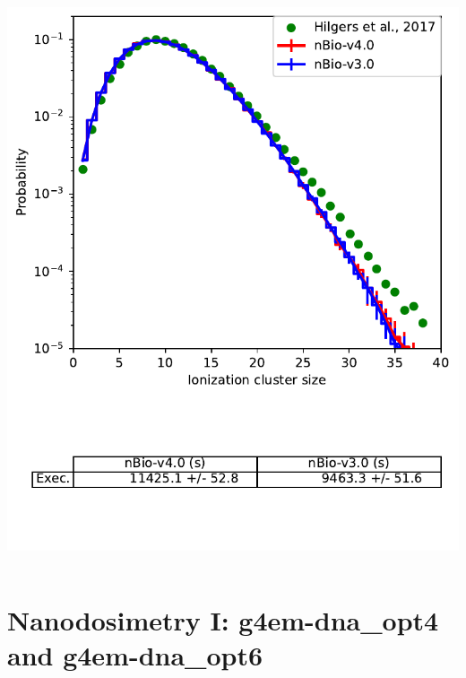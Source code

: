 \documentclass[aspectratio=1610]{beamer}
\begin{document}
\begin{frame}{\secname}
\begin{columns}
\begin{column}{0.4\linewidth}
     \includegraphics[width=\textwidth]{./NanodosimetryI/IDDistribution_opt2}
    \end{column}
   \end{columns}
\end{frame}

\section{Nanodosimetry I: g4em-dna\_opt4 and g4em-dna\_opt6}
\end{document}
